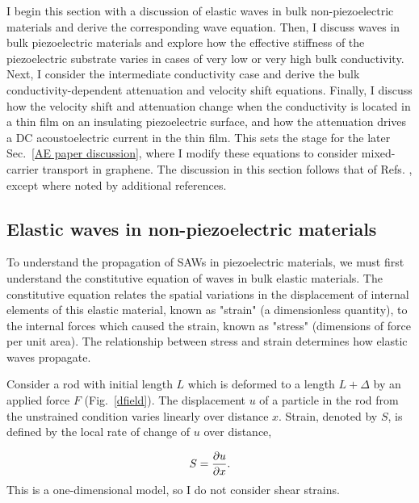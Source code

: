 \documentclass[double,12pt,1in,seploa]{beavtex}
\let\Oldsubsection\subsection
\renewcommand{\subsection}{\FloatBarrier\Oldsubsection}
\begin{document}
I begin this section with a discussion of elastic waves in bulk non-piezoelectric materials and derive the corresponding wave equation. Then, I discuss waves in bulk piezoelectric materials and explore how the effective stiffness of the piezoelectric substrate varies in cases of very low or very high bulk conductivity. Next, I consider the intermediate conductivity case and derive the bulk conductivity-dependent attenuation and velocity shift equations. Finally, I discuss how the velocity shift and attenuation change when the conductivity is located in a thin film on an insulating piezoelectric surface, and how the attenuation drives a DC acoustoelectric current in the thin film. This sets the stage for the later Sec.\ \ref{AE paper discussion}, where I modify these equations to consider mixed-carrier transport in graphene. The discussion in this section follows that of Refs. \cite{datta_surface_1986, weinreich_acoustodynamic_1956, hutson_elastic_1962, wixforth_surface_1989}, except where noted by additional references.

\subsection{Elastic waves in non-piezoelectric materials}
To understand the propagation of SAWs in piezoelectric materials, we must first understand the constitutive equation of waves in bulk elastic materials. The constitutive equation relates the spatial variations in the displacement of internal elements of this elastic material, known as "strain" (a dimensionless quantity), to the internal forces which caused the strain, known as "stress" (dimensions of force per unit area). The relationship between stress and strain determines how elastic waves propagate. 

Consider a rod with initial length $L$ which is deformed to a length $L + \Delta$ by an applied force $F$ (Fig.\ \ref{dfield}). The displacement $u$ of a particle in the rod from the unstrained condition varies linearly over distance $x$. Strain, denoted by $S$, is defined by the local rate of change of $u$ over distance, 

\begin{equation}
    S = \pdv{u}{x}. \label{strain-displacement equation}
\end{equation}
This is a one-dimensional model, so I do not consider shear strains.
\end{document}
